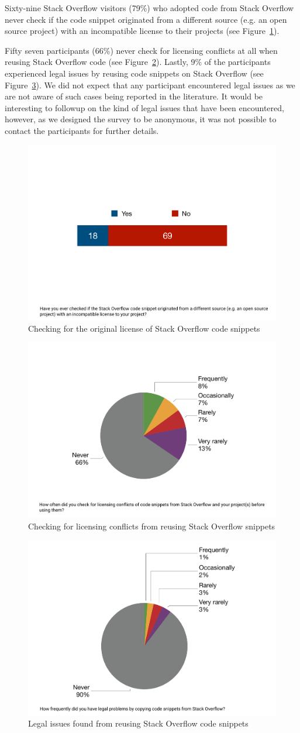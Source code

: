 \documentclass{svjour3}                     %
\begin{document}
Sixty-nine Stack Overflow visitors (79\%) who adopted code from Stack Overflow
never check if the code snippet originated from a different source (e.g. an open
source project) with an incompatible license to their projects (see
Figure~\ref{fig:survey_visitor_original_license}).

Fifty seven participants (66\%) never check for licensing conflicts at all
when reusing Stack Overflow code (see
Figure~\ref{fig:survey_visitor_licensing_conflict_check}). Lastly, 9\% of
the participants experienced legal issues by reusing code snippets on Stack
Overflow (see Figure~\ref{fig:survey_visitor_legal_issue}). We did not
expect that any participant encountered legal issues as we are not
aware of such cases being reported in the literature. It would
be interesting to followup on the kind of legal issues that have been
encountered, however, as we designed the
survey to be anonymous, it was not possible to contact the participants for further details.

\begin{figure} \centering
	\includegraphics[width=.4\linewidth]{survey_visitor_original_license} 
	\caption{Checking for the original license of Stack Overflow code snippets}
	\label{fig:survey_visitor_original_license} 
\end{figure}

\begin{figure} \centering
	\includegraphics[width=.4\linewidth]{survey_visitor_licensing_conflict_check} 
	\caption{Checking for licensing conflicts from reusing Stack Overflow snippets}
	\label{fig:survey_visitor_licensing_conflict_check} 
\end{figure}

\begin{figure} \centering
	\includegraphics[width=.4\linewidth]{survey_visitor_legal_issue} 
	\caption{Legal issues found from reusing Stack Overflow code snippets}
	\label{fig:survey_visitor_legal_issue} 
\end{figure}
\end{document}
